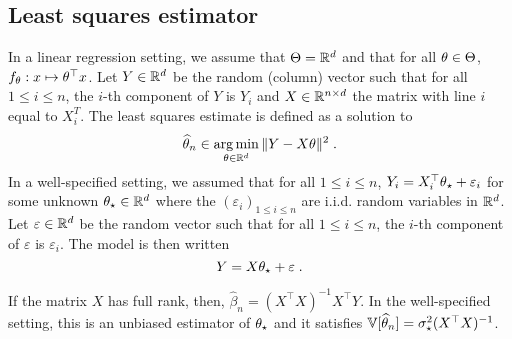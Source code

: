 \subsection{Least squares estimator}
In a linear regression setting, we assume that $\Theta = \mathbb{R}^d$ and that  for all $\theta\in\Theta$, $f_\theta: x \mapsto \theta^\top x$.  Let $Y\in\mathbb{R}^d$  be the random (column) vector such that  for all $1\leqslant i \leqslant n$, the $i$-th component of $Y$ is $Y_i$  and $X\in\mathbb{R}^{n\times d}$ the matrix with line $i$ equal to $X^T_i$. 
The least squares estimate is defined as a solution to
\[
\widehat \param_n\in  \argmin_{\param\in\rset^d}  \|Y - X\param\|^2\eqsp.
\]
In a well-specified setting, we assumed that  for all $1\leqslant i \leqslant n$, $Y_i = X^\top_i \theta_{\star} + \varepsilon_i$ for some unknown $\theta_\star\in\mathbb{R}^d$ where the $(\varepsilon_i)_{1\leqslant i\leqslant n}$ are i.i.d. random variables in $\mathbb{R}^d$. Let  $\varepsilon\in\mathbb{R}^d$  be the random vector such that  for all $1\leqslant i \leqslant n$, the $i$-th component of $\varepsilon$  is $\varepsilon_i$. The model is then written
\[
Y = X \theta_{\star} + \varepsilon\;.
\]
\begin{shaded}
\begin{proposition}
\label{prop:least:squares:full:rank}
If the matrix $X$ has full rank, then, $\widehat \beta_n = (X^\top X)^{-1}X^\top Y$. In the well-specified setting, this  is an unbiased estimator of $\theta_\star$ and it satisfies $\mathbb{V}[\widehat {\theta}_n] = \sigma_\star^2 (X^\top X)^{-1}$.
\end{proposition}
\end{shaded}

